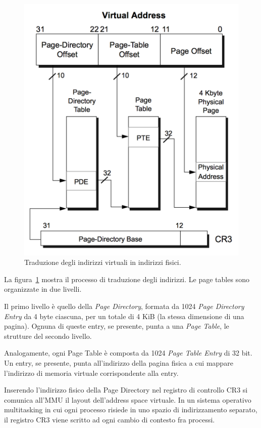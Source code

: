 \documentclass[12pt,a4paper]{report}
\begin{document}
		\begin{figure}[htbp]
		\centering
		\includegraphics[scale=0.8]{img/translation.png}
		\caption{Traduzione degli indirizzi virtuali in indirizzi fisici. \cite{AMD}\label{fig:translation}}
		\end{figure}
		
		La figura~\ref{fig:translation} mostra il processo di traduzione degli indirizzi. Le page tables sono organizzate
		in due livelli.
		
		Il primo livello è quello della \emph{Page Directory}, formata da 1024 \emph{Page Directory Entry} da 4 byte
		ciascuna, per un totale di 4 KiB (la stessa dimensione di una pagina). Ognuna di queste entry, se presente, punta
		a una \emph{Page Table}, le strutture del secondo livello.
		
		Analogamente, ogni Page Table è composta da 1024 \emph{Page Table Entry} di 32 bit. Un entry, se presente,
		punta all'indirizzo della pagina fisica a cui mappare l'indirizzo di memoria virtuale corrispondente alla entry.
		
		Inserendo l'indirizzo fisico della Page Directory nel registro di controllo CR3 si comunica all'MMU il layout
		dell'address space virtuale. In un sistema operativo multitasking in cui ogni processo risiede in uno spazio
		di indirizzamento separato, il registro CR3 viene scritto ad ogni cambio di contesto fra processi.
		
\end{document}
